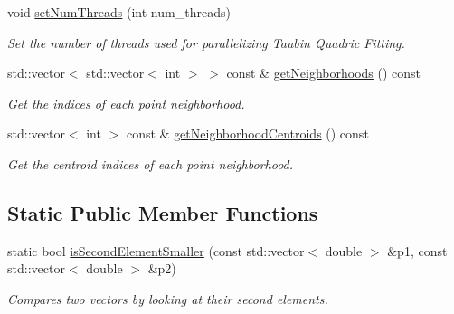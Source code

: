 \begin{DoxyCompactItemize}
void \hyperlink{classpcl_1_1_curvature_estimation_taubin_a9559e955c624d68cedc589abcdd729fe}{set\-Num\-Threads} (int num\-\_\-threads)
\begin{DoxyCompactList}\small\item\em \-Set the number of threads used for parallelizing \-Taubin \-Quadric \-Fitting. \end{DoxyCompactList}\item 
\hypertarget{classpcl_1_1_curvature_estimation_taubin_a4d7fe731d69c90cccc102e789cf96993}{std\-::vector$<$ std\-::vector$<$ int $>$\*
 $>$ const \& \hyperlink{classpcl_1_1_curvature_estimation_taubin_a4d7fe731d69c90cccc102e789cf96993}{get\-Neighborhoods} () const }\label{classpcl_1_1_curvature_estimation_taubin_a4d7fe731d69c90cccc102e789cf96993}

\begin{DoxyCompactList}\small\item\em \-Get the indices of each point neighborhood. \end{DoxyCompactList}\item 
\hypertarget{classpcl_1_1_curvature_estimation_taubin_ac4d3edafacb09b66e55f48aebf1c7a86}{std\-::vector$<$ int $>$ const \& \hyperlink{classpcl_1_1_curvature_estimation_taubin_ac4d3edafacb09b66e55f48aebf1c7a86}{get\-Neighborhood\-Centroids} () const }\label{classpcl_1_1_curvature_estimation_taubin_ac4d3edafacb09b66e55f48aebf1c7a86}

\begin{DoxyCompactList}\small\item\em \-Get the centroid indices of each point neighborhood. \end{DoxyCompactList}\end{DoxyCompactItemize}
\subsection*{\-Static \-Public \-Member \-Functions}
\begin{DoxyCompactItemize}
\item 
static bool \hyperlink{classpcl_1_1_curvature_estimation_taubin_ac5ea207470bf36fddd0161b45f46978a}{is\-Second\-Element\-Smaller} (const std\-::vector$<$ double $>$ \&p1, const std\-::vector$<$ double $>$ \&p2)
\begin{DoxyCompactList}\small\item\em \-Compares two vectors by looking at their second elements. \end{DoxyCompactList}\end{DoxyCompactItemize}

